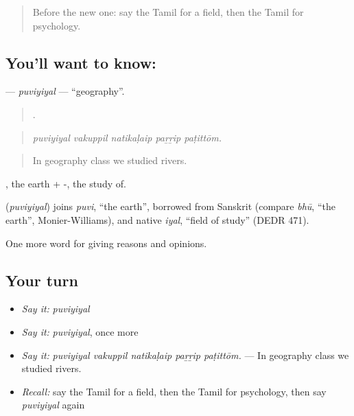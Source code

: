 \label{lesson:TA-C366-puviyiyal}



\begin{quote}
Before the new one: say the Tamil for a field, then the Tamil for psychology.
\end{quote}

\subsection*{You'll want to know: }
\textbf{} — \emph{puviyiyal} — \textquotedblleft{}geography\textquotedblright{}.

\begin{quote}
    .
\end{quote}

\begin{quote}
\emph{puviyiyal vakuppil natikaḷaip paṟṟip paṭittōm.}
\end{quote}

\begin{quote}
In geography class we studied rivers.
\end{quote}

, the earth + -, the study of.

\begin{cousinweb}
\textbf{} (\emph{puviyiyal}) joins \emph{puvi}, \textquotedblleft{}the earth\textquotedblright{}, borrowed from Sanskrit (compare \emph{bhū}, \textquotedblleft{}the earth\textquotedblright{}, Monier-Williams), and native \emph{iyal}, \textquotedblleft{}field of study\textquotedblright{} (DEDR 471).
\end{cousinweb}

\begin{grammarlens}[title={What you've built}]
One more word for giving reasons and opinions.
\end{grammarlens}

\subsection*{Your turn}
\begin{itemize}
\raggedright
  \item \emph{Say it:} \emph{puviyiyal}
  \item \emph{Say it:} \emph{puviyiyal}, once more
  \item \emph{Say it:} \emph{puviyiyal vakuppil natikaḷaip paṟṟip paṭittōm.} — In geography class we studied rivers.
  \item \emph{Recall:} say the Tamil for a field, then the Tamil for psychology, then say \emph{puviyiyal} again
\end{itemize}

